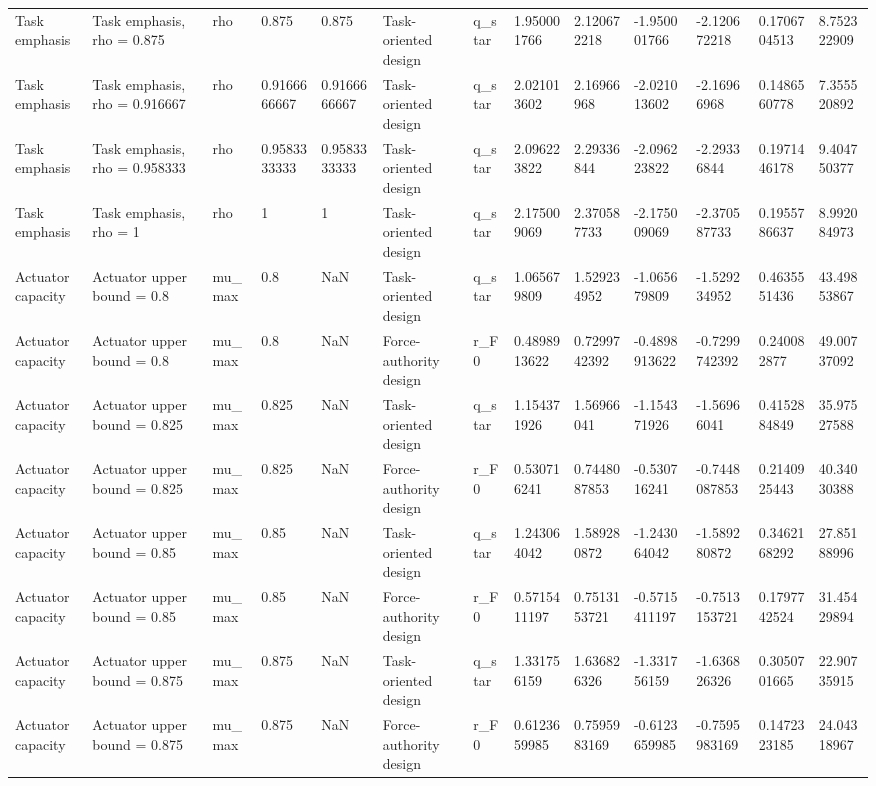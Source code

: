 \begin{tabular}{@{}lllllllllllll@{}}
Task emphasis & Task emphasis, rho = 0.875 & rho & 0.875 & 0.875 & Task-oriented design & q\_star & 1.950001766 & 2.120672218 & -1.950001766 & -2.120672218 & 0.1706704513 & 8.752322909 \\
Task emphasis & Task emphasis, rho = 0.916667 & rho & 0.9166666667 & 0.9166666667 & Task-oriented design & q\_star & 2.021013602 & 2.16966968 & -2.021013602 & -2.16966968 & 0.1486560778 & 7.355520892 \\
Task emphasis & Task emphasis, rho = 0.958333 & rho & 0.9583333333 & 0.9583333333 & Task-oriented design & q\_star & 2.096223822 & 2.29336844 & -2.096223822 & -2.29336844 & 0.1971446178 & 9.404750377 \\
Task emphasis & Task emphasis, rho = 1 & rho & 1 & 1 & Task-oriented design & q\_star & 2.175009069 & 2.370587733 & -2.175009069 & -2.370587733 & 0.1955786637 & 8.992084973 \\
Actuator capacity & Actuator upper bound = 0.8 & mu\_max & 0.8 & NaN & Task-oriented design & q\_star & 1.065679809 & 1.529234952 & -1.065679809 & -1.529234952 & 0.4635551436 & 43.49853867 \\
Actuator capacity & Actuator upper bound = 0.8 & mu\_max & 0.8 & NaN & Force-authority design & r\_F0 & 0.4898913622 & 0.7299742392 & -0.4898913622 & -0.7299742392 & 0.240082877 & 49.00737092 \\
Actuator capacity & Actuator upper bound = 0.825 & mu\_max & 0.825 & NaN & Task-oriented design & q\_star & 1.154371926 & 1.56966041 & -1.154371926 & -1.56966041 & 0.4152884849 & 35.97527588 \\
Actuator capacity & Actuator upper bound = 0.825 & mu\_max & 0.825 & NaN & Force-authority design & r\_F0 & 0.530716241 & 0.7448087853 & -0.530716241 & -0.7448087853 & 0.2140925443 & 40.34030388 \\
Actuator capacity & Actuator upper bound = 0.85 & mu\_max & 0.85 & NaN & Task-oriented design & q\_star & 1.243064042 & 1.589280872 & -1.243064042 & -1.589280872 & 0.3462168292 & 27.85188996 \\
Actuator capacity & Actuator upper bound = 0.85 & mu\_max & 0.85 & NaN & Force-authority design & r\_F0 & 0.5715411197 & 0.7513153721 & -0.5715411197 & -0.7513153721 & 0.1797742524 & 31.45429894 \\
Actuator capacity & Actuator upper bound = 0.875 & mu\_max & 0.875 & NaN & Task-oriented design & q\_star & 1.331756159 & 1.636826326 & -1.331756159 & -1.636826326 & 0.3050701665 & 22.90735915 \\
Actuator capacity & Actuator upper bound = 0.875 & mu\_max & 0.875 & NaN & Force-authority design & r\_F0 & 0.6123659985 & 0.7595983169 & -0.6123659985 & -0.7595983169 & 0.1472323185 & 24.04318967 \\

\end{tabular}
